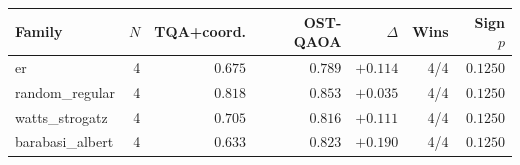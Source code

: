 \begin{tabular}{lrrrrrr}
\toprule
Family & $N$ & TQA+coord. & OST-QAOA & $\Delta$ & Wins & Sign $p$ \\
\midrule
er & 4 & $0.675$ & $0.789$ & $+0.114$ & 4/4 & $0.1250$ \\
random\_regular & 4 & $0.818$ & $0.853$ & $+0.035$ & 4/4 & $0.1250$ \\
watts\_strogatz & 4 & $0.705$ & $0.816$ & $+0.111$ & 4/4 & $0.1250$ \\
barabasi\_albert & 4 & $0.633$ & $0.823$ & $+0.190$ & 4/4 & $0.1250$ \\
\bottomrule
\end{tabular}

